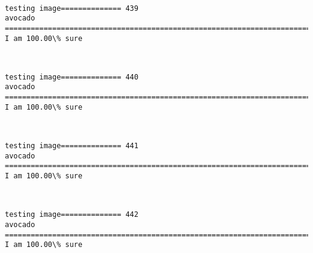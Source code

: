 \documentclass[11pt]{article}
\begin{document}
    \begin{center}
    \end{center}
    { \hspace*{\fill} \\}
    
    \begin{Verbatim}[commandchars=\\\{\}]
testing image============== 439
avocado
============================================================================
I am 100.00\% sure

    \end{Verbatim}

    \begin{center}
    \end{center}
    { \hspace*{\fill} \\}
    
    \begin{Verbatim}[commandchars=\\\{\}]
testing image============== 440
avocado
============================================================================
I am 100.00\% sure

    \end{Verbatim}

    \begin{center}
    \end{center}
    { \hspace*{\fill} \\}
    
    \begin{Verbatim}[commandchars=\\\{\}]
testing image============== 441
avocado
============================================================================
I am 100.00\% sure

    \end{Verbatim}

    \begin{center}
    \end{center}
    { \hspace*{\fill} \\}
    
    \begin{Verbatim}[commandchars=\\\{\}]
testing image============== 442
avocado
============================================================================
I am 100.00\% sure

    \end{Verbatim}
\end{document}
